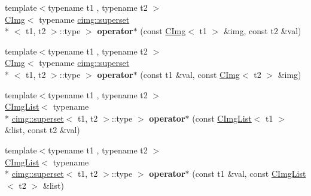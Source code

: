 \begin{DoxyCompactItemize}
\item 
\hypertarget{namespacecimg__library_afce8c78ee2a0106d8592b68c8d9d1ee6}{{\footnotesize template$<$typename t1 , typename t2 $>$ }\\\hyperlink{structcimg__library_1_1_c_img}{C\-Img}$<$ typename \hyperlink{structcimg__library_1_1cimg_1_1superset}{cimg\-::superset}\\*
$<$ t1, t2 $>$\-::type $>$ {\bfseries operator$\ast$} (const \hyperlink{structcimg__library_1_1_c_img}{C\-Img}$<$ t1 $>$ \&img, const t2 \&val)}\label{namespacecimg__library_afce8c78ee2a0106d8592b68c8d9d1ee6}

\item 
\hypertarget{namespacecimg__library_a1350ee9a31804f9cd439a58b127c20c1}{{\footnotesize template$<$typename t1 , typename t2 $>$ }\\\hyperlink{structcimg__library_1_1_c_img}{C\-Img}$<$ typename \hyperlink{structcimg__library_1_1cimg_1_1superset}{cimg\-::superset}\\*
$<$ t1, t2 $>$\-::type $>$ {\bfseries operator$\ast$} (const t1 \&val, const \hyperlink{structcimg__library_1_1_c_img}{C\-Img}$<$ t2 $>$ \&img)}\label{namespacecimg__library_a1350ee9a31804f9cd439a58b127c20c1}

\item 
\hypertarget{namespacecimg__library_afa041143a33afba2cc42547b59a684f6}{{\footnotesize template$<$typename t1 , typename t2 $>$ }\\\hyperlink{structcimg__library_1_1_c_img_list}{C\-Img\-List}$<$ typename \\*
\hyperlink{structcimg__library_1_1cimg_1_1superset}{cimg\-::superset}$<$ t1, t2 $>$\-::type $>$ {\bfseries operator$\ast$} (const \hyperlink{structcimg__library_1_1_c_img_list}{C\-Img\-List}$<$ t1 $>$ \&list, const t2 \&val)}\label{namespacecimg__library_afa041143a33afba2cc42547b59a684f6}

\item 
\hypertarget{namespacecimg__library_a0ce618578ff4ad0130a98f23cdeb2579}{{\footnotesize template$<$typename t1 , typename t2 $>$ }\\\hyperlink{structcimg__library_1_1_c_img_list}{C\-Img\-List}$<$ typename \\*
\hyperlink{structcimg__library_1_1cimg_1_1superset}{cimg\-::superset}$<$ t1, t2 $>$\-::type $>$ {\bfseries operator$\ast$} (const t1 \&val, const \hyperlink{structcimg__library_1_1_c_img_list}{C\-Img\-List}$<$ t2 $>$ \&list)}\label{namespacecimg__library_a0ce618578ff4ad0130a98f23cdeb2579}


\end{DoxyCompactItemize}
